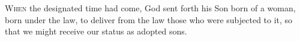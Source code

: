 
\lettrine{W}{hen} the designated time had come, God sent forth his Son born of a woman, born under the law, to deliver from the law those who were subjected to it, so that we might receive our status as adopted sons.
